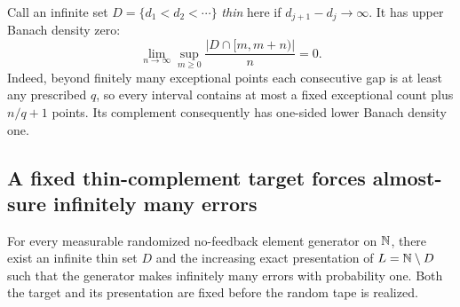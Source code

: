 Call an infinite set $D=\{d_1<d_2<\cdots\}$ \emph{thin} here if $d_{j+1}-d_j\to\infty$. It has upper Banach density zero:
\[
\lim_{n\to\infty}\sup_{m\ge0}\frac{|D\cap[m,m+n)|}{n}=0.
\]
Indeed, beyond finitely many exceptional points each consecutive gap is at least any prescribed $q$, so every interval contains at most a fixed exceptional count plus $n/q+1$ points. Its complement consequently has one-sided lower Banach density one.

\subsection{A fixed thin-complement target forces almost-sure infinitely many errors}

\begin{theorem}\label{sh:element-diagonal}
For every measurable randomized no-feedback element generator on $\mathbb N$, there exist an infinite thin set $D$ and the increasing exact presentation of $L=\mathbb N\setminus D$ such that the generator makes infinitely many errors with probability one. Both the target and its presentation are fixed before the random tape is realized.
\end{theorem}
